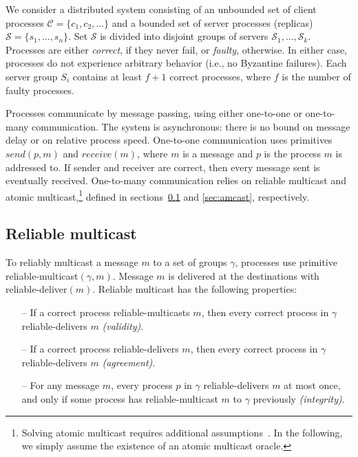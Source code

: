\documentclass[11pt]{article}
\newcommand{\ccm}{\mathcal{C}}
\newcommand{\ssm}{\mathcal{S}}
\newcommand{\rmcast}{reliable-multicast}
\newcommand{\rmdel}{reliable-deliver}
\begin{document}
We consider a distributed system consisting of an unbounded set of client processes $\ccm = \{c_1, c_2, ...\}$ and a bounded set of server processes (replicas) $\ssm = \{s_1, ..., s_n\}$.
Set $\ssm$ is divided into disjoint groups of servers $\ssm_1, ..., \ssm_k$.
Processes are either \emph{correct}, if they never fail, or \emph{faulty}, otherwise.
In either case, processes do not experience arbitrary behavior (i.e., no Byzantine failures).
Each server group $S_i$ contains at least $f + 1$ correct processes, where $f$ is the number of faulty processes.

Processes communicate by message passing, using either one-to-one or one-to-many communication.
The system is asynchronous: there is no bound on message delay or on relative process speed.
One-to-one communication uses primitives $send(p,m)$ and $receive(m)$, where $m$ is a message and $p$ is the process $m$ is addressed to.
If sender and receiver are correct, then every message sent is eventually received.
%
One-to-many communication relies on reliable multicast and atomic multicast,\footnote{Solving atomic multicast requires additional assumptions~\cite{CT96,FLP85}. In the following, we simply assume the existence of an atomic multicast oracle.}
defined in sections~\ref{sec:rmcast} and \ref{sec:amcast}, respectively.


\subsection{Reliable multicast}
\label{sec:rmcast}

To reliably multicast a message $m$ to a set of groups $\gamma$, processes use primitive \rmcast$(\gamma, m)$.
Message $m$ is delivered at the destinations with \rmdel$(m)$.
Reliable multicast has the following properties:

\begin{itemize}

    \item[--] If a correct process \rmcast{}s $m$, then every correct process in $\gamma$ \rmdel{}s $m$ \emph{(validity)}.

    \item[--] If a correct process \rmdel{}s $m$, then every correct process in $\gamma$ \rmdel{}s $m$ \emph{(agreement)}.

    \item[--] For any message $m$, every process $p$ in $\gamma$ \rmdel{}s $m$ at most once, and only if some process has \rmcast{} $m$  to $\gamma$ previously \emph{(integrity)}.

\end{itemize}
\end{document}
